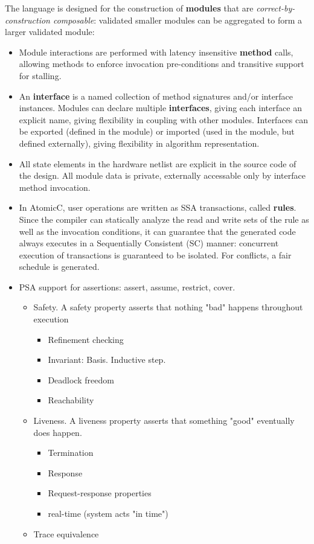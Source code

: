 The language is designed for
the construction of \textbf{modules} that are \textit{correct-by-construction composable}:
validated smaller modules can be aggregated to form
a larger validated module:
\begin{itemize}

\item Module interactions are performed with
latency insensitive
\textbf{method} calls, allowing methods to enforce invocation pre-conditions
and transitive support for stalling.

\item An \textbf{interface} is a named collection of method signatures and/or interface instances.
Modules can declare
multiple \textbf{interfaces}, giving each interface an explicit name,
giving flexibility in coupling with other modules.
Interfaces can be exported (defined in the module) or imported (used in
the module, but defined externally), giving flexibility in algorithm
representation.

\item All state elements in the hardware
netlist are explicit in the source code of the design.
All module data is private, externally accessable only by interface method invocation.

\item In AtomicC, user operations are written as SSA transactions, called \textbf{rules}.  Since the
compiler can statically analyze the read and write sets of the rule as well as the
invocation conditions, it can guarantee that the generated code always executes
in a Sequentially Consistent (SC) manner: concurrent execution of transactions is
guaranteed to be isolated.  For conflicts, a fair schedule is generated.

\item PSA support for assertions: assert, assume, restrict, cover.
\begin{itemize}
\item Safety. A safety property asserts that nothing "bad" happens throughout execution
\begin{itemize}
\setlength\itemsep{-0.5em}
\item Refinement checking
\item Invariant:  Basis.  Inductive step.
\item Deadlock freedom
\item Reachability
\end{itemize}
\item Liveness. A liveness property asserts that something "good" eventually does happen.
\begin{itemize}
\setlength\itemsep{-0.5em}
\item Termination
\item Response
\item Request-response properties
\item real-time (system acts "in time")
\end{itemize}
\item Trace equivalence
\end{itemize}


\end{itemize}
